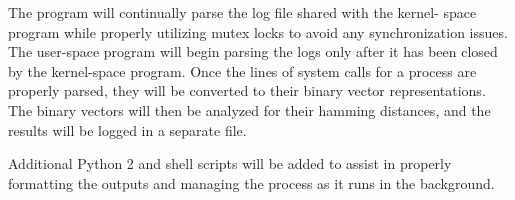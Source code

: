 \documentclass[paper=usletter, fontsize=12pt]{article}
\begin{document}
    The program will continually parse the log file shared with the kernel-
    space program while properly utilizing mutex locks to avoid any
    synchronization issues. The user-space program will begin parsing the logs
    only after it has been closed by the kernel-space program. Once the lines
    of system calls for a process are properly parsed, they will be converted
    to their binary vector representations. The binary vectors will then be
    analyzed for their hamming distances, and the results will be logged in a
    separate file.

    Additional Python 2 and shell scripts will be added to assist in properly
    formatting the outputs and managing the process as it runs in the
    background.
\end{document}
